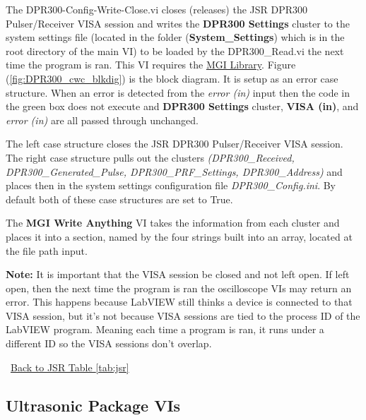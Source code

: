 \documentclass[11pt,a4paper,oldfontcommands]{memoir}
\begin{document}
The DPR300-Config-Write-Close.vi closes (releases) the JSR DPR300 Pulser/Receiver VISA session and writes the \textbf{DPR300 Settings} cluster to the system settings file (located in the folder (\textbf{System\_Settings}) which is in the root directory of the main VI) to be loaded by the DPR300\_Read.vi the next time the program is ran. This VI requires the \href{http://sine.ni.com/nips/cds/view/p/lang/en/nid/209753}{MGI Library}. Figure (\ref{fig:DPR300_cwc_blkdig}) is the block diagram.  It is setup as an error case structure. When an error is detected from the \textit{error (in)} input then the code in the green box does not execute and \textbf{DPR300 Settings} cluster, \textbf{VISA (in)}, and \textit{error (in)} are all passed through unchanged.

The left case structure closes the JSR DPR300 Pulser/Receiver VISA session. The right case structure pulls out the clusters \textit{(DPR300\_Received, DPR300\_Generated\_Pulse, DPR300\_PRF\_Settings, DPR300\_Address)} and places then in the system settings configuration file \textit{DPR300\_Config.ini}. By default both of these case structures are set to True.

The \textbf{MGI Write Anything} VI takes the information from each cluster and places it into a section, named by the four strings built into an array, located at the file path input.

\textbf{Note:} It is important that the VISA session be closed and not left open. If left open, then the next time the program is ran the oscilloscope VIs may return an error. This happens because LabVIEW still thinks a device is connected to that VISA session, but it's not because VISA sessions are tied to the process ID of the LabVIEW program. Meaning each time a program is ran, it runs under a different ID so the VISA sessions don't overlap.

\noindent\hrulefill\, \hyperref[tab:jsr]{Back to JSR Table \ref{tab:jsr}}

\newpage

\subsection{Ultrasonic Package VIs}
\end{document}
